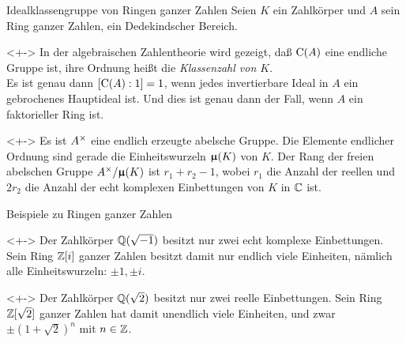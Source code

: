 \begin{frame}{Idealklassengruppe von Ringen ganzer Zahlen}
	Seien \(K\) ein Zahlkörper und \(A\) sein Ring ganzer Zahlen, ein
	Dedekindscher Bereich.
	\begin{remark}<+->
		In der algebraischen Zahlentheorie wird gezeigt, daß \(\operatorname{C}(A)\)
		eine endliche Gruppe ist, ihre Ordnung heißt die \emph{Klassenzahl von
		\(K\)}.
		\\
		Es ist genau dann \([\operatorname{C}(A) : 1] = 1\), wenn jedes invertierbare
		Ideal in \(A\) ein gebrochenes Hauptideal ist. Und dies ist genau dann
		der Fall, wenn \(A\) ein faktorieller Ring ist.
	\end{remark}
	\begin{remark}<+->
		Es ist \(A^\times\) eine endlich erzeugte abelsche Gruppe. Die Elemente
		endlicher Ordnung sind gerade die Einheitswurzeln \(\boldsymbol{\upmu}(K)\) von \(K\).
		Der Rang der freien abelschen Gruppe \(A^\times/\boldsymbol{\upmu}(K)\) ist \(r_1
		+ r_2 - 1\), wobei \(r_1\) die Anzahl der reellen und
		\(2 r_2\) die Anzahl der echt komplexen Einbettungen von \(K\) in \(\mathbb C\)
		ist.
	\end{remark}
\end{frame}

\begin{frame}{Beispiele zu Ringen ganzer Zahlen}
	\begin{example}<+->
		Der Zahlkörper \(\mathbb Q(\sqrt{-1})\) besitzt nur zwei echt komplexe Einbettungen.
		Sein Ring \(\mathbb Z[i]\) ganzer Zahlen besitzt damit nur endlich viele Einheiten,
		nämlich alle Einheitswurzeln: \(\pm 1, \pm i\).
	\end{example}
	\begin{example}<+->
		Der Zahlkörper \(\mathbb Q(\sqrt{2})\) besitzt nur zwei reelle Einbettungen.
		Sein Ring \(\mathbb Z[\sqrt{2}]\) ganzer Zahlen hat damit unendlich viele
		Einheiten, und zwar \(\pm (1 + \sqrt{2})^n\) mit \(n \in \mathbb Z\).
	\end{example}
\end{frame}

